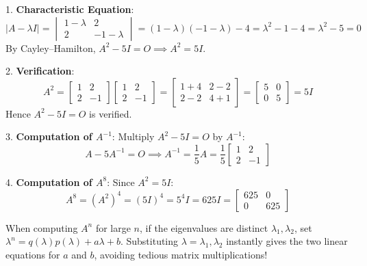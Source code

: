 \begin{solutionbox}
1. \textbf{Characteristic Equation}:
\begin{equation}
|A - \lambda I| = \begin{vmatrix} 1 - \lambda & 2 \\ 2 & -1 - \lambda \end{vmatrix} = (1-\lambda)(-1-\lambda) - 4 = \lambda^2 - 1 - 4 = \lambda^2 - 5 = 0
\end{equation}
By Cayley--Hamilton, $A^2 - 5I = O \implies A^2 = 5I$.

2. \textbf{Verification}:
\begin{equation}
A^2 = \begin{bmatrix} 1 & 2 \\ 2 & -1 \end{bmatrix} \begin{bmatrix} 1 & 2 \\ 2 & -1 \end{bmatrix} = \begin{bmatrix} 1+4 & 2-2 \\ 2-2 & 4+1 \end{bmatrix} = \begin{bmatrix} 5 & 0 \\ 0 & 5 \end{bmatrix} = 5I
\end{equation}
Hence $A^2 - 5I = O$ is verified.

3. \textbf{Computation of $A^{-1}$}:
Multiply $A^2 - 5I = O$ by $A^{-1}$:
\begin{equation}
A - 5A^{-1} = O \implies A^{-1} = \frac{1}{5}A = \frac{1}{5}\begin{bmatrix} 1 & 2 \\ 2 & -1 \end{bmatrix}
\end{equation}

4. \textbf{Computation of $A^8$}:
Since $A^2 = 5I$:
\begin{equation}
A^8 = (A^2)^4 = (5I)^4 = 5^4 I = 625 I = \begin{bmatrix} 625 & 0 \\ 0 & 625 \end{bmatrix}
\end{equation}
\end{solutionbox}

\begin{examtip}
When computing $A^n$ for large $n$, if the eigenvalues are distinct $\lambda_1, \lambda_2$, set $\lambda^n = q(\lambda)p(\lambda) + a\lambda + b$. Substituting $\lambda = \lambda_1, \lambda_2$ instantly gives the two linear equations for $a$ and $b$, avoiding tedious matrix multiplications!
\end{examtip}

